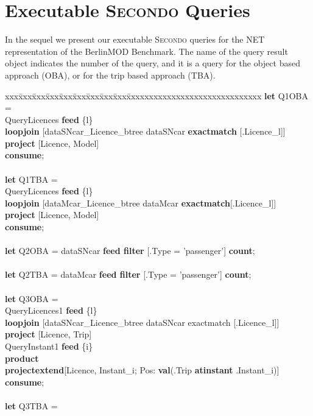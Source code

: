 \documentclass[a4paper]{article}
\newcommand{\secondo}{\textsc{Secondo}}
\newcommand{\bmodb} {BerlinMOD Benchmark}
\newcommand{\op}[1]{\textbf{#1}}
\begin{document}
\section{Executable \secondo{} Queries}
In the sequel we present our executable \secondo{} queries for the NET representation
of the \bmodb{}. The name of the query result object indicates the number of
the query, and it is a query for the object based approach (OBA), or for the
trip based approach (TBA).
\begin{scriptsize}
\begin{tabbing}
xxx\=xxx\=xxx\=xxx\=xxx\=xxx\=xxx\=xxx\=xxx\=xxxxxxxxxxxxxxxxxxxxxxxxxxxxxx\kill
\op{let} Q1OBA =\\
\>QueryLicences \op{feed} \{l\}\\
\>\>\op{loopjoin} [dataSNcar\_Licence\_btree dataSNcar \op{exactmatch} [.Licence\_l]]\\
\>\>\>\op{project} [Licence, Model]\\
\op{consume};\\
\\
\op{let} Q1TBA =\\
\>QueryLicences \op{feed} \{l\}\\
\>\>\op{loopjoin} [dataMcar\_Licence\_btree dataMcar \op{exactmatch}[.Licence\_l]]\\
\>\>\op{project} [Licence, Model]\\
\op{consume};\\
\\
\op{let} Q2OBA = dataSNcar \op{feed filter} [.Type = 'passenger'] \op{count};\\
\\
\op{let} Q2TBA = dataMcar \op{feed filter} [.Type = 'passenger'] \op{count};\\
\\
\op{let} Q3OBA =\\
\>QueryLicences1 \op{feed} \{l\}\\
\>\>\op{loopjoin} [dataSNcar\_Licence\_btree dataSNcar exactmatch [.Licence\_l]]\\
\>\>\op{project} [Licence, Trip]\\
\>QueryInstant1 \op{feed} \{i\}\\
\>\op{product}\\
\>\op{projectextend}[Licence, Instant\_i; Pos: \op{val}(.Trip \op{atinstant} .Instant\_i)]\\
\op{consume};\\
\\
\op{let} Q3TBA =\\

\end{tabbing}
\end{scriptsize}
\end{document}
